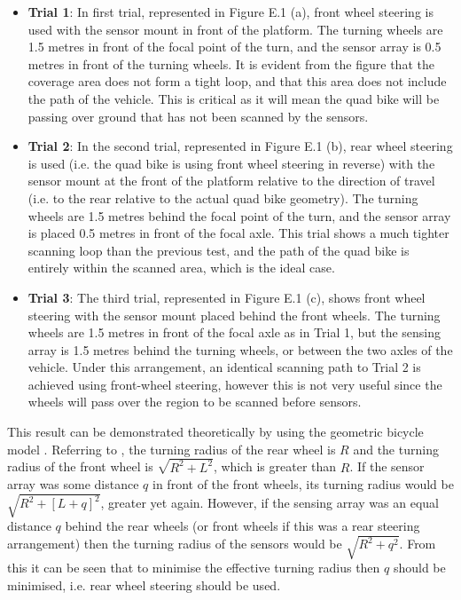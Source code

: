 \documentclass[main.tex]{subfiles}
\begin{document}
\begin{appendices}
\begin{itemize}
\item \textbf{Trial 1}: In first trial, represented in Figure E.1 (a), front wheel steering is used with the sensor mount in front of the platform. The turning wheels are 1.5 metres in front of the focal point of the turn, and the sensor array is 0.5 metres in front of the turning wheels. It is evident from the figure that the coverage area does not form a tight loop, and that this area does not include the path of the vehicle. This is critical as it will mean the quad bike will be passing over ground that has not been scanned by the sensors.
\item \textbf{Trial 2}: In the second trial, represented in Figure E.1 (b), rear wheel steering is used (i.e. the quad bike is using front wheel steering in reverse) with the sensor mount at the front of the platform relative to the direction of travel (i.e. to the rear relative to the actual quad bike geometry). The turning wheels are 1.5 metres behind the focal point of the turn, and the sensor array is placed 0.5 metres in front of the focal axle. This trial shows a much tighter scanning loop than the previous test, and the path of the quad bike is entirely within the scanned area, which is the ideal case.
\item \textbf{Trial 3}: The third trial, represented in Figure E.1 (c), shows front wheel steering with the sensor mount placed behind the front wheels. The turning wheels are 1.5 metres in front of the focal axle as in Trial 1, but the sensing array is 1.5 metres behind the turning wheels, or between the two axles of the vehicle. Under this arrangement, an identical scanning path to Trial 2 is achieved using front-wheel steering, however this is not very useful since the wheels will pass over the region to be scanned before sensors.
\end{itemize}

This result can be demonstrated theoretically by using the geometric bicycle model \parencite{snider2009}. Referring to , the turning radius of the rear wheel is $R$ and the turning radius of the front wheel is $\sqrt{R^2 + L^2}$, which is greater than $R$. If the sensor array was some distance $q$ in front of the front wheels, its turning radius would be $\sqrt{R^2 + [L+q]^2}$, greater yet again. However, if the sensing array was an equal distance $q$ behind the rear wheels (or front wheels if this was a rear steering arrangement) then the turning radius of the sensors would be $\sqrt{R^2 + q^2}$. From this it can be seen that to minimise the effective turning radius then $q$ should be minimised, i.e. rear wheel steering should be used. 



\end{appendices}
\end{document}
